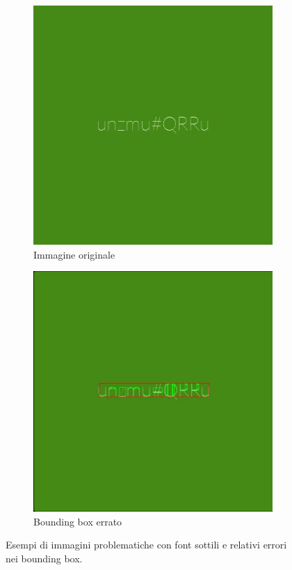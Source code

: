 \begin{figure}[htbp]
    \centering
    \begin{subfigure}[t]{0.45\textwidth}
        \centering
        \includegraphics[width=\textwidth]{images/thin_font1.png}
        \caption{Immagine originale}
    \end{subfigure}
    \hfill
    \begin{subfigure}[t]{0.45\textwidth}
        \centering
        \includegraphics[width=\textwidth]{images/thin_font1_preproc.png}
        \caption{Bounding box errato}
    \end{subfigure}

    \caption{Esempi di immagini problematiche con font sottili e relativi errori nei bounding box.}
    \label{fig:thin_fonts_bboxes}
\end{figure}

